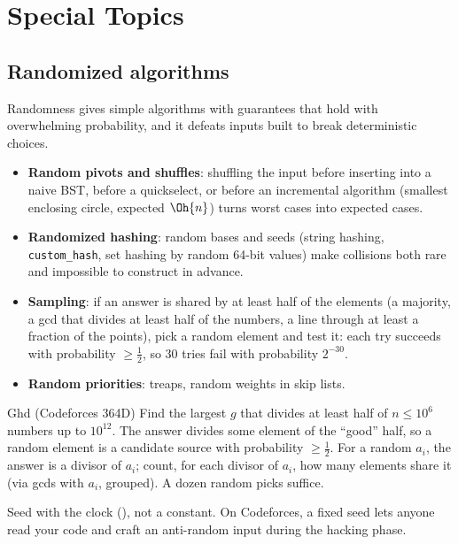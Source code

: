 \chapter{Special Topics}\label{ch:special}

\section[Randomized algorithms]{Randomized algorithms \hfill \plat}

Randomness gives simple algorithms with guarantees that hold with overwhelming probability, and it defeats inputs built to
break deterministic choices.

\begin{itemize}
  \item \textbf{Random pivots and shuffles}: shuffling the input before inserting into a naive BST, before a quickselect, or before
        an incremental algorithm (smallest enclosing circle, expected $\Oh{n}$) turns worst cases into expected cases.
  \item \textbf{Randomized hashing}: random bases and seeds (string hashing, \texttt{custom\_hash}, set hashing by random 64-bit
        values) make collisions both rare and impossible to construct in advance.
  \item \textbf{Sampling}: if an answer is shared by at least half of the elements (a majority, a gcd that divides at least half
        of the numbers, a line through at least a fraction of the points), pick a random element and test it: each try succeeds
        with probability $\ge \frac12$, so 30 tries fail with probability $2^{-30}$.
  \item \textbf{Random priorities}: treaps, random weights in skip lists.
\end{itemize}

\begin{problem}{Ghd (Codeforces 364D)}
Find the largest $g$ that divides at least half of $n \le 10^6$ numbers up to $10^{12}$.
\solution The answer divides some element of the ``good'' half, so a random element is a candidate source with probability
$\ge \frac12$. For a random $a_i$, the answer is a divisor of $a_i$; count, for each divisor of $a_i$, how many elements share it
(via gcds with $a_i$, grouped). A dozen random picks suffice.
\end{problem}

\begin{pitfall}[Seeds]
Seed with the clock (), not a constant. On Codeforces, a fixed seed
lets anyone read your code and craft an anti-random input during the hacking phase.
\end{pitfall}

